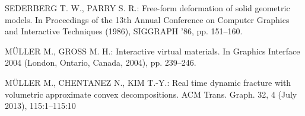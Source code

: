 \documentclass[
	11pt, 
	DIV10,
	a4paper, 
	oneside, 
	headings=normal, 
	captions=tableheading,
	final, 
	numbers=noenddot
]{scrartcl}
\begin{document}
\begin{thebibliography}{15}
	SEDERBERG T. W., PARRY S. R.: Free-form deformation of
	solid geometric models. In Proceedings of the 13th Annual
	Conference on Computer Graphics and Interactive Techniques
	(1986), SIGGRAPH ’86, pp. 151–160.
	
	MÜLLER M., GROSS M. H.: Interactive virtual materials. In
	Graphics Interface 2004 (London, Ontario, Canada, 2004),
	pp. 239–246.
	
	MÜLLER M., CHENTANEZ N., KIM T.-Y.: Real time dynamic
	fracture with volumetric approximate convex decompositions.
	ACM Trans. Graph. 32, 4 (July 2013), 115:1–115:10
\end{thebibliography}
\end{document}

